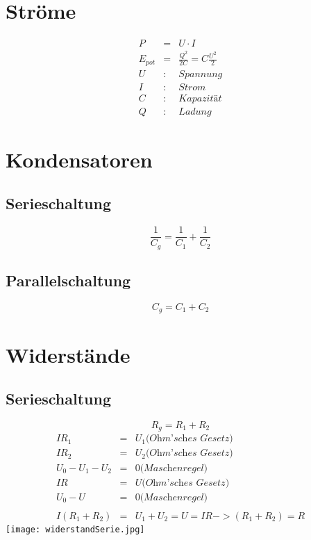 \documentclass[11pt]{article}
\begin{document}
\section{Ströme}
\begin{eqnarray*}
P &=& U\cdot I\\
E_{pot} &=& \frac{Q^2}{2C} = C \frac{U^2}{2}\\
U &:& \textit{Spannung}\\
I &:& \textit{Strom}\\
C &:& \textit{Kapazität}\\
Q &:& \textit{Ladung}
\end{eqnarray*}

\section{Kondensatoren}
\subsection{Serieschaltung}
$$\frac{1}{C_g}=\frac{1}{C_1}+\frac{1}{C_2}$$


\subsection{Parallelschaltung}
$$ C_g = C_1 +C_2$$

\section{Widerstände}
\subsection{Serieschaltung}
$$R_g=R_1+R_2$$
\begin{eqnarray*}
IR_1&=&U_1 \textit{(Ohm'sches Gesetz)}\\
IR_2&=&U_2 \textit{(Ohm'sches Gesetz)}\\
U_0 - U_1 - U_2 &=& 0 \textit{(Maschenregel)}\\
IR &=& U \textit{(Ohm'sches Gesetz)}\\
U_0 - U &=& 0 \textit{(Maschenregel)}\\\\
I(R_1+R_2)&=&U_1+U_2 = U = IR -> (R_1+R_2) = R
\end{eqnarray*}
\texttt{[image: widerstandSerie.jpg]}
\pagebreak
\end{document}
